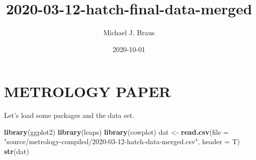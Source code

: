 \documentclass[]{article}
\title{2020-03-12-hatch-final-data-merged}
\author{Michael J. Braus}
\date{2020-10-01}
\newenvironment{Shaded}{\begin{snugshade}}{\end{snugshade}}
\newcommand{\DataTypeTok}[1]{\textcolor[rgb]{0.13,0.29,0.53}{#1}}
\newcommand{\KeywordTok}[1]{\textcolor[rgb]{0.13,0.29,0.53}{\textbf{#1}}}
\newcommand{\NormalTok}[1]{#1}
\newcommand{\StringTok}[1]{\textcolor[rgb]{0.31,0.60,0.02}{#1}}
\begin{document}
\maketitle

{
\setcounter{tocdepth}{2}
\tableofcontents
}
\fontsize{12}{14}
\selectfont{}

\hypertarget{metrology-paper}{%
\section{METROLOGY PAPER}\label{metrology-paper}}

Let's load some packages and the data set.

\begin{Shaded}
\begin{Highlighting}[]
\KeywordTok{library}\NormalTok{(ggplot2)}
\KeywordTok{library}\NormalTok{(leaps)}
\KeywordTok{library}\NormalTok{(cowplot)}
\NormalTok{dat <-}\StringTok{ }\KeywordTok{read.csv}\NormalTok{(}\DataTypeTok{file =} \StringTok{"source/metrology-compiled/2020-03-12-hatch-data-merged.csv"}\NormalTok{, }\DataTypeTok{header =}\NormalTok{ T)}
\KeywordTok{str}\NormalTok{(dat)}
\end{Highlighting}
\end{Shaded}
\end{document}
